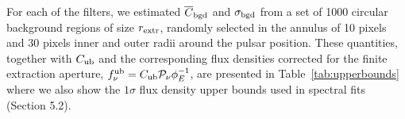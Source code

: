 \documentclass[pdftex,twocolumn]{aastex62}
\newcommand{\gp}[1]{{\color{blue} #1}}
\begin{document}
For each of the filters, we estimated $\overline{C}_{\rm bgd}$ and $\sigma_{\rm bgd}$ from a set of 1000 circular background  
regions of size $r_{\rm extr}$, randomly selected 
in the 
annulus of 10 pixels 
and 30 pixels inner and outer radii 
around the pulsar position. %
These quantities, together with $C_{\rm ub}$ and the corresponding flux densities corrected for the finite extraction aperture, $f_\nu^{\rm ub} = C_{\rm ub} {\cal P}_\nu \phi_E^{-1}$, are presented in Table~\ref{tab:upperbounds} where we also show the $1\sigma$ flux density  upper bounds used in spectral fits (Section 5.2).
\end{document}
